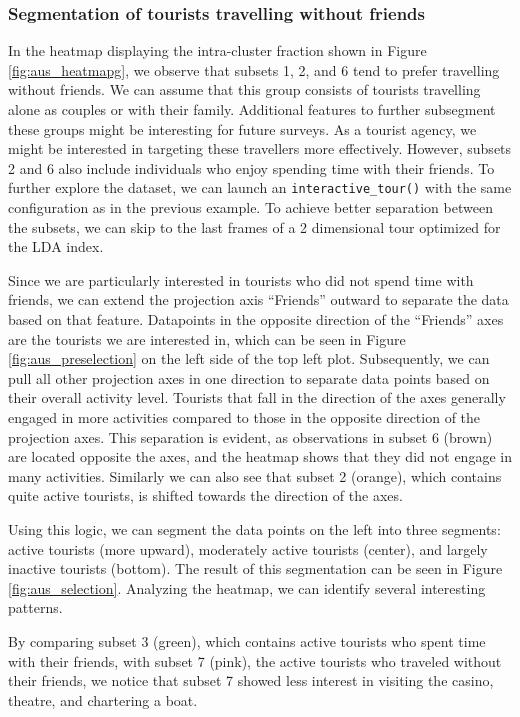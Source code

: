 \documentclass[article]{ajs}
\begin{document}
\subsubsection{Segmentation of tourists travelling without friends}

In the heatmap displaying the intra-cluster fraction shown in Figure \ref{fig:aus_heatmapg}, we observe that subsets 1, 2, and 6 tend to prefer travelling without friends. We can assume that this group consists of tourists travelling alone as couples or with their family. Additional features to further subsegment these groups might be interesting for future surveys. As a tourist agency, we might be interested in targeting these travellers more effectively. However, subsets 2 and 6 also include individuals who enjoy spending time with their friends. To further explore the dataset, we can launch an \texttt{interactive\_tour()} with the same configuration as in the previous example. To achieve better separation between the subsets, we can skip to the last frames of a 2 dimensional tour optimized for the LDA index. 

Since we are particularly interested in tourists who did not spend time with friends, we can extend the projection axis ``Friends'' outward to separate the data based on that feature. Datapoints in the opposite direction of the ``Friends'' axes are the tourists we are interested in, which can be seen in Figure \ref{fig:aus_preselection} on the left side of the top left plot. Subsequently, we can pull all other projection axes in one direction to separate data points based on their overall activity level. Tourists that fall in the direction of the axes generally engaged in more activities compared to those in the opposite direction of the projection axes. This separation is evident, as observations in subset 6 (brown) are located opposite the axes, and the heatmap shows that they did not engage in many activities. Similarly we can also see that subset 2 (orange), which contains quite active tourists, is shifted towards the direction of the axes.

Using this logic, we can segment the data points on the left into three segments: active tourists (more upward), moderately active tourists (center), and largely inactive tourists (bottom). The result of this segmentation can be seen in Figure \ref{fig:aus_selection}. Analyzing the heatmap, we can identify several interesting patterns.

By comparing subset 3 (green), which contains active tourists who spent time with their friends, with subset 7 (pink), the active tourists who traveled without their friends, we notice that subset 7 showed less interest in visiting the casino, theatre, and chartering a boat.
\end{document}
